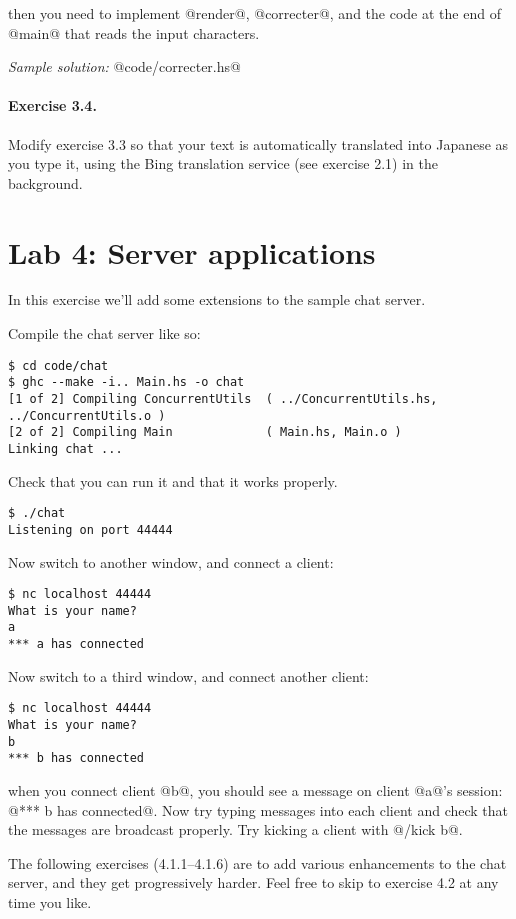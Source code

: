 \documentclass[11pt,a4paper]{article}
\newcommand{\Section}[2]{\section{#2}\label{sec:#1}}
\begin{document}
\noindent then you need to implement @render@, @correcter@, and the
code at the end of @main@ that reads the input characters.

\emph{Sample solution:} @code/correcter.hs@

\paragraph{Exercise 3.4.} Modify exercise 3.3 so that your text is
automatically translated into Japanese as you type it, using the Bing
translation service (see exercise 2.1) in the background.

\newpage\Section{servers}{Lab 4: Server applications}

In this exercise we'll add some extensions to the sample chat server.

Compile the chat server like so:

{\small \begin{verbatim}
$ cd code/chat
$ ghc --make -i.. Main.hs -o chat
[1 of 2] Compiling ConcurrentUtils  ( ../ConcurrentUtils.hs, ../ConcurrentUtils.o )
[2 of 2] Compiling Main             ( Main.hs, Main.o )
Linking chat ...
\end{verbatim}}

Check that you can run it and that it works properly.

{\small \begin{verbatim}
$ ./chat
Listening on port 44444
\end{verbatim}}

\noindent Now switch to another window, and connect a client:

{\small \begin{verbatim}
$ nc localhost 44444
What is your name?
a
*** a has connected
\end{verbatim}}

\noindent Now switch to a third window, and connect another client:

{\small \begin{verbatim}
$ nc localhost 44444
What is your name?
b
*** b has connected
\end{verbatim}}

\noindent when you connect client @b@, you should see a message on
client @a@'s session: @*** b has connected@.  Now try typing messages
into each client and check that the messages are broadcast properly.
Try kicking a client with @/kick b@.

The following exercises (4.1.1--4.1.6) are to add various enhancements
to the chat server, and they get progressively harder.  Feel free to
skip to exercise 4.2 at any time you like.
\end{document}
